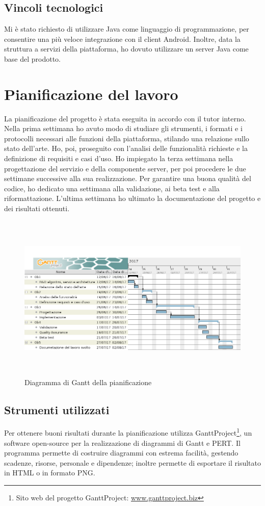    \subsection{Vincoli tecnologici}
   Mi è stato richiesto di utilizzare Java come linguaggio di programmazione, per consentire una più veloce integrazione con il client Android. Inoltre, data la struttura a servizi della piattaforma, ho dovuto utilizzare un server Java come base del prodotto.

\section{Pianificazione del lavoro}
La pianificazione del progetto è stata eseguita in accordo con il tutor interno. Nella prima settimana ho avuto modo di studiare gli strumenti, i formati e i protocolli necessari alle funzioni della piattaforma, stilando una relazione sullo stato dell'arte. Ho, poi, proseguito con l'analisi delle funzionalità richieste e la definizione di requisiti e casi d'uso. Ho impiegato la terza settimana nella progettazione del servizio e della componente server, per poi procedere le due settimane successive alla sua realizzazione. Per garantire una buona qualità del codice, ho dedicato una settimana alla validazione, ai beta test e alla riformattazione. L'ultima settimana ho ultimato la documentazione del progetto e dei risultati ottenuti.
\begin{figure}[H]
   \begin{center}
      \includegraphics[height=8cm,width=15cm,keepaspectratio]{immagini/pianificazione-gantt}
      \caption{Diagramma di Gantt della pianificazione}
   \end{center}
\end{figure}

   \subsection{Strumenti utilizzati}
   Per ottenere buoni risultati durante la pianificazione \nomeAzienda{} utilizza GanttProject\footnote{Sito web del progetto GanttProject: \href{http://www.ganttproject.biz/}{www.ganttproject.biz}}, un software open-source per la realizzazione di diagrammi di \gls{Gantt} e \gls{PERT}. Il programma permette di costruire diagrammi con estrema facilità, gestendo scadenze, risorse, personale e dipendenze; inoltre permette di esportare il risultato in HTML o in formato PNG.\
